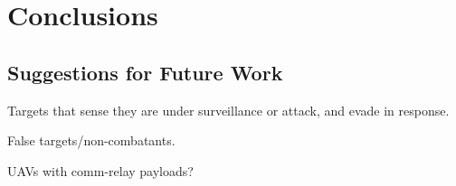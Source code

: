 \chapter{Conclusions}


\section{Suggestions for Future Work}
Targets that sense they are under surveillance or attack, and evade in response.

False targets/non-combatants.

UAVs with comm-relay payloads?